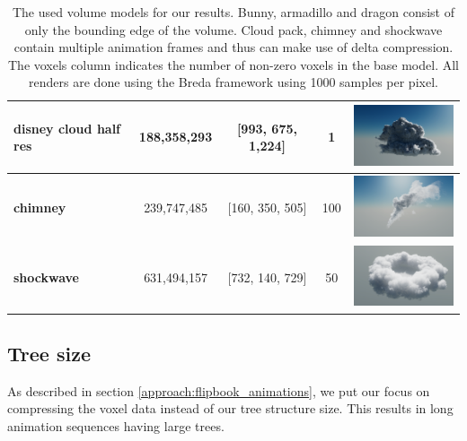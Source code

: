\begin{table}[htbp]
\begin{tabularx}{\textwidth}{|X|c|c|c|c|}
    \hline
    \raggedright\textbf{disney cloud half res} & 188,358,293 & [993, 675, 1,224] & 1 & \includegraphics[width=4cm]{figures/disney cloud.png}\\
    \hline
    \textbf{chimney} & 239,747,485 & [160, 350, 505] & 100 & \includegraphics[width=4cm]{figures/chimney.png}\\
    \hline
    \textbf{shockwave} & 631,494,157 & [732, 140, 729] & 50 & \includegraphics[width=4cm]{figures/shockwave.png}\\
    \hline
    \end{tabularx}
    \caption{The used volume models for our results. Bunny, armadillo and dragon consist of only the bounding edge of the volume. Cloud pack, chimney and shockwave contain multiple animation frames and thus can make use of delta compression. The voxels column indicates the number of non-zero voxels in the base model. All renders are done using the Breda framework using 1000 samples per pixel. }
    \label{tab:data-summary}
\end{table}


\subsection{Tree size} \label{results:tree_size}
As described in section \ref{approach:flipbook_animations}, we put our focus on compressing the voxel data instead of our tree structure size. This results in long animation sequences having large trees.  

